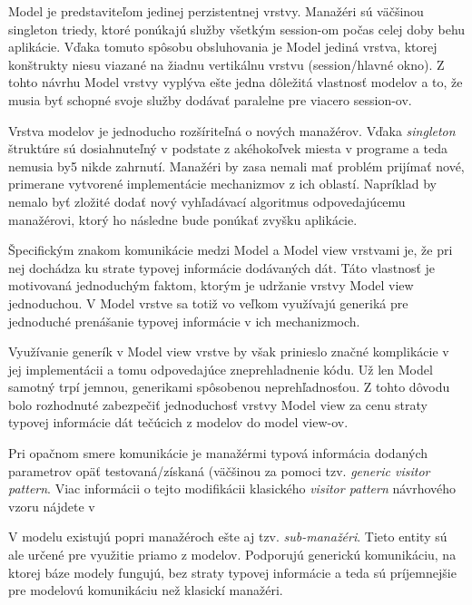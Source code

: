 Model je predstaviteľom jedinej perzistentnej  vrstvy. Manažéri sú väčšinou singleton triedy, ktoré ponúkajú služby všetkým session-om počas celej doby behu aplikácie. Vďaka tomuto spôsobu obsluhovania je Model jediná vrstva, ktorej konštrukty niesu viazané na žiadnu vertikálnu vrstvu (session/hlavné okno). Z tohto návrhu Model vrstvy vyplýva ešte jedna dôležitá vlastnosť modelov a to, že musia byť schopné svoje služby dodávať paralelne pre viacero session-ov. 

Vrstva modelov je jednoducho rozšíriteľná o nových manažérov. Vďaka \textit{singleton} štruktúre sú dosiahnuteľný v podstate z akéhokoľvek miesta v programe a teda nemusia by5 nikde zahrnutí. Manažéri by zasa nemali mať problém prijímať nové, primerane vytvorené implementácie mechanizmov z ich oblastí. Napríklad by nemalo byť zložité dodať nový vyhľadávací algoritmus odpovedajúcemu manažérovi, ktorý ho následne bude ponúkať zvyšku aplikácie. %

Špecifickým znakom komunikácie medzi Model a Model view vrstvami je, že pri nej dochádza ku strate typovej informácie dodávaných dát. Táto vlastnosť je motivovaná jednoduchým faktom, ktorým je udržanie vrstvy Model view jednoduchou. V Model vrstve sa totiž vo veľkom využívajú generiká pre jednoduché prenášanie typovej informácie v ich mechanizmoch. 

Využívanie generík v Model view vrstve by však prinieslo značné komplikácie v jej implementácii a tomu odpovedajúce zneprehladnenie kódu. Už len Model samotný trpí jemnou, generikami spôsobenou neprehľadnosťou. Z tohto dôvodu bolo rozhodnuté zabezpečiť jednoduchosť vrstvy Model view za cenu straty typovej informácie dát tečúcich z modelov do model view-ov. 

Pri opačnom smere komunikácie je manažérmi typová informácia dodaných parametrov opäť testovaná/získaná (väčšinou za pomoci tzv. \textit{generic visitor pattern}. Viac informácii o tejto modifikácii klasického \textit{visitor pattern} návrhového vzoru nájdete v %

V modelu existujú popri manažéroch ešte aj tzv. \textit{sub-manažéri}. Tieto entity sú ale určené pre využitie priamo z modelov. Podporujú generickú komunikáciu, na ktorej báze modely fungujú, bez straty typovej informácie a teda sú príjemnejšie pre modelovú komunikáciu než klasickí manažéri.     

